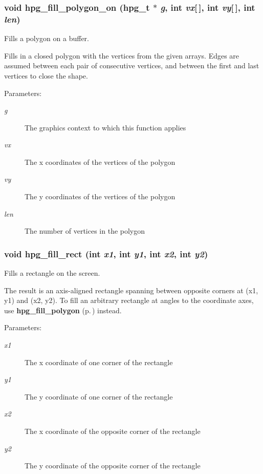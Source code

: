 \subsubsection{\setlength{\rightskip}{0pt plus 5cm}void hpg\_\-fill\_\-polygon\_\-on ({\bf hpg\_\-t} $\ast$ {\em g}, int {\em vx}[$\,$], int {\em vy}[$\,$], int {\em len})}\label{hpgraphics_8h_a54}


Fills a polygon on a buffer.

Fills in a closed polygon with the vertices from the given arrays. Edges are assumed between each pair of consecutive vertices, and between the first and last vertices to close the shape.\begin{Desc}
\item[Parameters: ]\par
\begin{description}
\item[{\em 
g}]The graphics context to which this function applies \item[{\em 
vx}]The x coordinates of the vertices of the polygon \item[{\em 
vy}]The y coordinates of the vertices of the polygon \item[{\em 
len}]The number of vertices in the polygon \end{description}
\end{Desc}
\subsubsection{\setlength{\rightskip}{0pt plus 5cm}void hpg\_\-fill\_\-rect (int {\em x1}, int {\em y1}, int {\em x2}, int {\em y2})}\label{hpgraphics_8h_a47}


Fills a rectangle on the screen.

The result is an axis-aligned rectangle spanning between opposite corners at (x1, y1) and (x2, y2). To fill an arbitrary rectangle at angles to the coordinate axes, use {\bf hpg\_\-fill\_\-polygon} {\rm (p.\,\pageref{hpgraphics_8h_a55})} instead.\begin{Desc}
\item[Parameters: ]\par
\begin{description}
\item[{\em 
x1}]The x coordinate of one corner of the rectangle \item[{\em 
y1}]The y coordinate of one corner of the rectangle \item[{\em 
x2}]The x coordinate of the opposite corner of the rectangle \item[{\em 
y2}]The y coordinate of the opposite corner of the rectangle \end{description}
\end{Desc}
